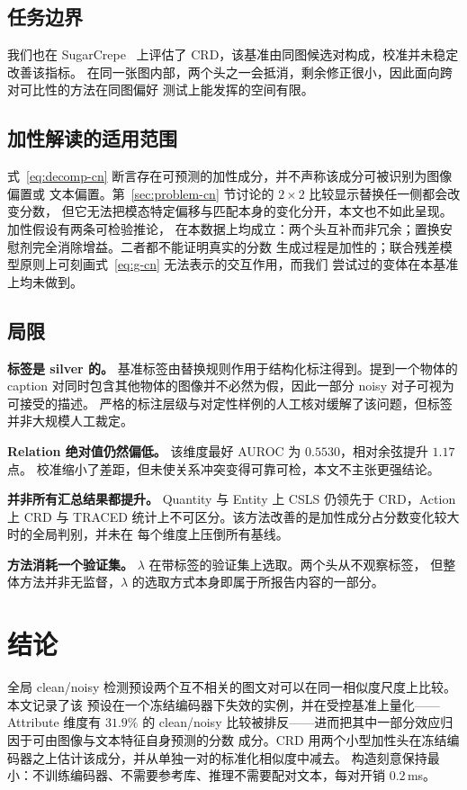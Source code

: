 \documentclass[10pt,twocolumn,a4paper]{ctexart}
\begin{document}
\subsection{任务边界}
我们也在 SugarCrepe~\cite{sugarcrepe} 上评估了 CRD，该基准由同图候选对构成，校准并未稳定改善该指标。
在同一张图内部，两个头之一会抵消，剩余修正很小，因此面向跨对可比性的方法在同图偏好
测试上能发挥的空间有限。

\subsection{加性解读的适用范围}
式~\eqref{eq:decomp-cn} 断言存在可预测的加性成分，并不声称该成分可被识别为图像偏置或
文本偏置。第~\ref{sec:problem-cn} 节讨论的 $2\times2$ 比较显示替换任一侧都会改变分数，
但它无法把模态特定偏移与匹配本身的变化分开，本文也不如此呈现。加性假设有两条可检验推论，
在本数据上均成立：两个头互补而非冗余；置换安慰剂完全消除增益。二者都不能证明真实的分数
生成过程是加性的；联合残差模型原则上可刻画式~\eqref{eq:g-cn} 无法表示的交互作用，而我们
尝试过的变体在本基准上均未做到。

\subsection{局限}
\textbf{标签是 silver 的。} 基准标签由替换规则作用于结构化标注得到。提到一个物体的
caption 对同时包含其他物体的图像并不必然为假，因此一部分 noisy 对子可视为可接受的描述。
严格的标注层级与对定性样例的人工核对缓解了该问题，但标签并非大规模人工裁定。

\textbf{Relation 绝对值仍然偏低。} 该维度最好 AUROC 为 $0.5530$，相对余弦提升 $1.17$ 点。
校准缩小了差距，但未使关系冲突变得可靠可检，本文不主张更强结论。

\textbf{并非所有汇总结果都提升。} Quantity 与 Entity 上 CSLS 仍领先于 CRD，Action 上
CRD 与 TRACED 统计上不可区分。该方法改善的是加性成分占分数变化较大时的全局判别，并未在
每个维度上压倒所有基线。

\textbf{方法消耗一个验证集。} $\lambda$ 在带标签的验证集上选取。两个头从不观察标签，
但整体方法并非无监督，$\lambda$ 的选取方式本身即属于所报告内容的一部分。

\section{结论}

全局 clean/noisy 检测预设两个互不相关的图文对可以在同一相似度尺度上比较。本文记录了该
预设在一个冻结编码器下失效的实例，并在受控基准上量化——Attribute 维度有 $31.9\%$ 的
clean/noisy 比较被排反——进而把其中一部分效应归因于可由图像与文本特征自身预测的分数
成分。CRD 用两个小型加性头在冻结编码器之上估计该成分，并从单独一对的标准化相似度中减去。
构造刻意保持最小：不训练编码器、不需要参考库、推理不需要配对文本，每对开销 $0.2$\,ms。
\end{document}
